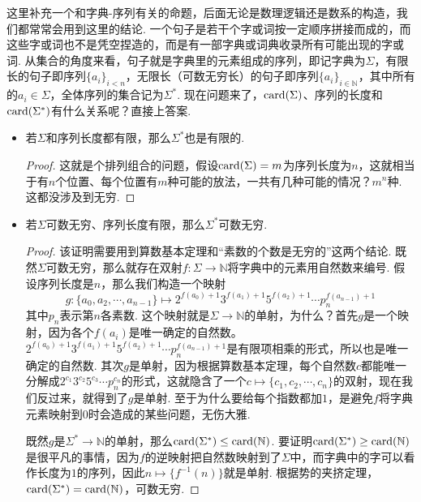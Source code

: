 \documentclass[main.tex]{subfiles}
\begin{document}
这里补充一个和字典-序列有关的命题，后面无论是数理逻辑还是数系的构造，我们都常常会用到这里的结论. 一个句子是若干个字或词按一定顺序拼接而成的，而这些字或词也不是凭空捏造的，而是有一部字典或词典收录所有可能出现的字或词. 从集合的角度来看，句子就是字典里的元素组成的序列，即记字典为\(\Sigma\)，有限长的句子即序列\(\{a_i\}_{i < n}\)，无限长（可数无穷长）的句子即序列\(\{a_i\}_{i \in \mathbb{N}}\)，其中所有的\(a_i \in \Sigma\)，全体序列的集合记为\(\Sigma^*\). 现在问题来了，\({\rm card}(\Sigma)\)、序列的长度和\({\rm card}(\Sigma^*)\)有什么关系呢？直接上答案.
\begin{itemize}
    \item 若\(\Sigma\)和序列长度都有限，那么\(\Sigma^*\)也是有限的.
    \begin{proof}
        这就是个排列组合的问题，假设\({\rm card}(\Sigma)=m\)为序列长度为\(n\)，这就相当于有\(n\)个位置、每个位置有\(m\)种可能的放法，一共有几种可能的情况？\(m^n\)种. 这都没涉及到无穷.
    \end{proof}

    \item 若\(\Sigma\)可数无穷、序列长度有限，那么\(\Sigma^*\)可数无穷.
    \begin{proof}

        该证明需要用到算数基本定理和“素数的个数是无穷的”这两个结论. 既然\(\Sigma\)可数无穷，那么就存在双射\(f:\Sigma \to \mathbb{N}\)将字典中的元素用自然数来编号. 假设序列长度是\(n\)，那么我们构造一个映射
        \[g: \{a_0, a_2, \cdots, a_{n-1}\} \mapsto 2^{f(a_0)+1}3^{f(a_1)+1}5^{f(a_2)+1}\cdots p_n^{f(a_{n-1})+1}\]
        其中\(p_n\)表示第\(n\)各素数. 这个映射就是\(\Sigma \to \mathbb{N}\)的单射，为什么？首先\(g\)是一个映射，因为各个\(f(a_i)\)是唯一确定的自然数。\(2^{f(a_0)+1}3^{f(a_1)+1}5^{f(a_2)+1}\cdots p_n^{f(a_{n-1})+1}\)是有限项相乘的形式，所以也是唯一确定的自然数. 其次\(g\)是单射，因为根据算数基本定理，每个自然数\(c\)都能唯一分解成\(2^{c_1}3^{c_2}5^{c_3}\cdots p_n^{c_n}\)的形式，这就隐含了一个\(c \mapsto \{c_1, c_2, \cdots, c_n\}\)的双射，现在我们反过来，就得到了\(g\)是单射. 至于为什么要给每个指数都加\(1\)，是避免\(f\)将字典元素映射到\(0\)时会造成的某些问题，无伤大雅. 

        既然\(g\)是\(\Sigma^* \to \mathbb{N}\)的单射，那么\({\rm card}(\Sigma^*) \leq {\rm card}(\mathbb{N})\). 要证明\({\rm card}(\Sigma^*) \geq {\rm card}(\mathbb{N})\)是很平凡的事情，因为\(f\)的逆映射把自然数映射到了\(\Sigma\)中，而字典中的字可以看作长度为\(1\)的序列，因此\(n \mapsto \{f^{-1}(n)\}\)就是单射. 根据势的夹挤定理，\({\rm card}(\Sigma^*) = {\rm card}(\mathbb{N})\)，可数无穷.
    \end{proof}


\end{itemize}
\end{document}
